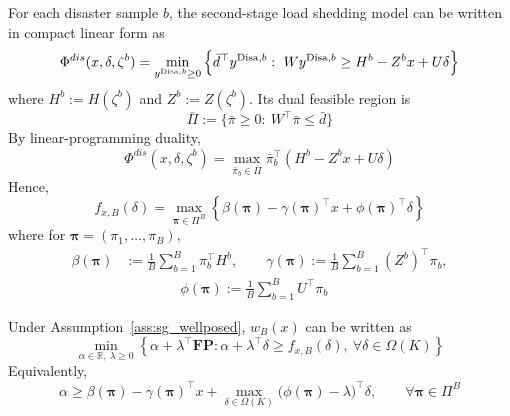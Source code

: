 \hspace*{0.7em}For each disaster sample $b$, the second-stage load shedding model can be written in compact linear form as
\begin{equation*}
\Phi^{dis}(x,\delta,\zeta^b)
=
\min_{y^{{\rm Disa},b}\ge 0}
\Big\{\bar d^\top y^{{\rm Disa},b}:\ Wy^{{\rm Disa},b}\ge H^b-Z^b x+U\delta\Big\}
\end{equation*}
where $H^b:=H(\zeta^b)$ and $Z^b:=Z(\zeta^b)$. Its dual feasible region is
\begin{equation}
\label{eq:dual_poly_compact}
\bar\Pi:=\{\bar\pi\ge 0:\ W^\top\bar\pi\le \bar d\}
\end{equation}
\hspace*{0.7em}By linear-programming duality,
\begin{equation}
\label{eq:disaster_dual_compact}
\Phi^{dis}(x,\delta,\zeta^b)
=
\max_{\bar\pi_b\in\bar\Pi}
\bar\pi_b^\top(H^b-Z^b x+U\delta)
\end{equation}
\hspace*{0.7em}Hence,
\begin{equation}
\label{eq:sg_fx_dual}
f_{x,B}(\delta)
=
\max_{\boldsymbol{\pi}\in\Pi^B}
\left\{\beta(\boldsymbol{\pi})-\gamma(\boldsymbol{\pi})^\top x+\phi(\boldsymbol{\pi})^\top\delta\right\}
\end{equation}
where for $\boldsymbol{\pi}=(\pi_1,\dots,\pi_B)$,
\[
\begin{aligned}
    \beta(\boldsymbol{\pi})&:=\frac{1}{B}\sum_{b=1}^B \pi_b^\top H^b, \qquad
\gamma(\boldsymbol{\pi}):=\frac{1}{B}\sum_{b=1}^B (Z^b)^\top\pi_b,\\
&\qquad  \qquad \phi(\boldsymbol{\pi}):=\frac{1}{B}\sum_{b=1}^B U^\top\pi_b
\end{aligned}
\]
\hspace*{0.7em}\begin{proposition}
\label{prop:sg_moment_dual}
Under Assumption~\ref{ass:sg_wellposed}, $w_B(x)$ can be written as
\begin{equation}
\label{eq:sg_moment_dual}
\min_{\alpha\in\mathbb{R},\ \lambda\ge 0}
\left\{\alpha+\lambda^\top \mathbf{FP}: \alpha+\lambda^\top\delta\ge f_{x,B}(\delta),\ \forall\delta\in\Omega(K)\right\}
\end{equation}
Equivalently,
\begin{equation*}
\alpha
\ge
\beta(\boldsymbol{\pi})-\gamma(\boldsymbol{\pi})^\top x
+\max_{\delta\in\Omega(K)}\big(\phi(\boldsymbol{\pi})-\lambda\big)^\top\delta,
\qquad \forall\boldsymbol{\pi}\in\Pi^B
\end{equation*}
\end{proposition}

